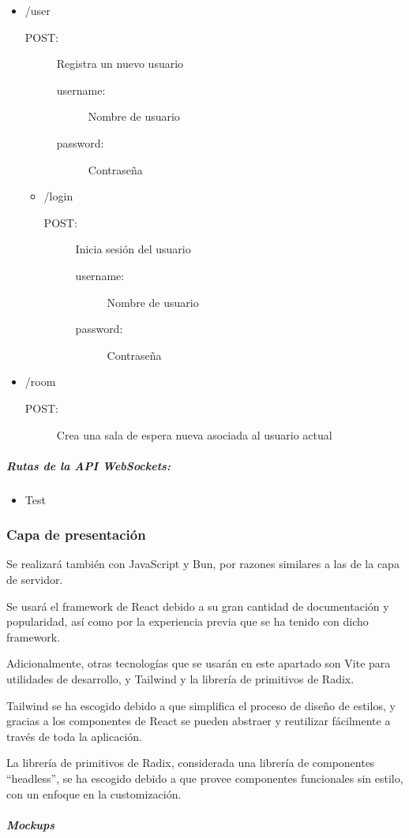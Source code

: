 \begin{itemize}
  \item /user
    \begin{description}
      \item[POST:] Registra un nuevo usuario
        \begin{description}
          \item[username:] Nombre de usuario
          \item[password:] Contraseña
        \end{description}
    \end{description}
    \begin{itemize}
      \item /login
        \begin{description}
          \item[POST:] Inicia sesión del usuario
            \begin{description}
              \item[username:] Nombre de usuario
              \item[password:] Contraseña
            \end{description}
        \end{description}
    \end{itemize}
  \item /room
      \begin{description}
      \item[POST:] Crea una sala de espera nueva asociada al usuario actual
      \end{description}
\end{itemize}
\subparagraph{Rutas de la API WebSockets:}
\begin{itemize}
  \item Test
\end{itemize}

\subsubsection{Capa de presentación}

Se realizará también con JavaScript y Bun, por razones similares a las de la capa de servidor. 

Se usará el framework de React debido a su gran cantidad de documentación y popularidad, así como por la experiencia previa que se ha tenido con dicho framework. 

Adicionalmente, otras tecnologías que se usarán en este apartado son Vite para utilidades de desarrollo, y Tailwind y la librería de primitivos de Radix. 

Tailwind se ha escogido debido a que simplifica el proceso de diseño de estilos, y gracias a los componentes de React se pueden abstraer y reutilizar fácilmente a través de toda la aplicación. 

La librería de primitivos de Radix, considerada una librería de componentes “headless”, se ha escogido debido a que provee componentes funcionales sin estilo, con un enfoque en la customización. 

\subparagraph{Mockups}
